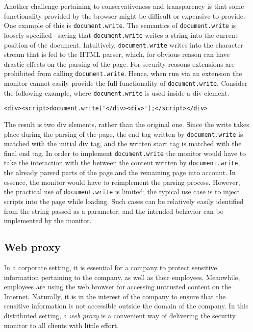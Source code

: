\documentclass{llncs}
\newcommand{\todo}[1]{\colorbox{red}{\textcolor{white}{\sffamily\bfseries\scriptsize TODO}} \textcolor{red}{#1} \textcolor{red}{$\blacktriangleleft$}}
\begin{document}
Another challenge pertaining to conservativeness and transparency is that some
functionality provided by the browser might be difficult or expensive to
provide.  One example of this is \lstinline{document.write}. The semantics of
\lstinline{document.write} is loosely specified~\cite{DOM:LVL2} saying that
\lstinline{document.write} writes a string into the current position of the
document.  Intuitively, \lstinline{document.write} writes into the character
stream that is fed to the HTML parser, which, for obvious reason can have
drastic effects on the parsing of the page. For security reasons extensions are
prohibited from calling \lstinline{document.write}. Hence, when run via an
extension the monitor cannot easily provide the full functionality of
\lstinline{document.write}.  Consider the following example, where
\lstinline{document.write} is used inside a div element.

\begin{lstlisting}[language=langsmall]
<div><script>document.write('</div><div>');</script></div>
\end{lstlisting}

The result is two div elements, rather than the original one. Since the write
takes place during the parsing of the page, the end tag written by
\lstinline{document.write} is matched with the initial div tag, and the written
start tag is matched with the final end tag. In order to implement
\lstinline{document.write} the monitor would have to take the interaction with the
between the content written by \lstinline{document.write}, the already parsed parts
of the page and the remaining page into account. In essence, the monitor would
have to reimplement the parsing process.  However, the practical use of
\lstinline{document.write} is limited; the typical use case is to inject scripts
into the page while loading. Such cases can be relatively easily identified
from the string passed as a parameter, and the intended behavior can be
implemented by the monitor.




\subsection{Web proxy}
\label{sec:arch-web}
In a corporate setting, it is essential for a company to protect 
sensitive information pertaining to the company, as well as their employees. 
Meanwhile, employees are using the web browser for accessing untrusted content on 
the Internet. Naturally, it is in the interest of the company to ensure that 
the sensitive information is not accessible outside the domain of the company.
In this distributed setting, a \emph{web proxy} is a convenient way of delivering 
the security monitor to all clients with little effort. 
\end{document}
